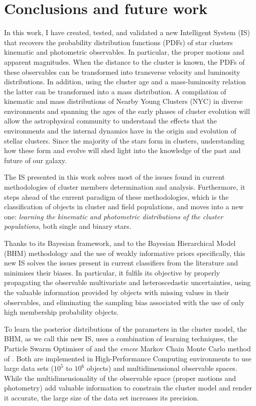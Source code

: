 \chapter{Conclusions and future work}
\label{chap:conclusions}

In this work, I have created, tested, and validated a new Intelligent System (IS) that recovers the probability distribution functions (PDFs) of star clusters kinematic and photometric observables. In particular, the proper motions and apparent magnitudes. When the distance to the cluster is known, the PDFs of these observables can be transformed into transverse velocity and luminosity distributions. In addition, using the cluster age and a mass-luminosity relation the latter can be transformed into a mass distribution. A compilation of kinematic and mass distributions of Nearby Young Clusters (NYC) in diverse environments and spanning the ages of the early phases of cluster evolution will allow the astrophysical community to understand the effects that the environments and the internal dynamics have in the origin and evolution of stellar clusters. Since the majority of the stars form in clusters, understanding how these form and evolve will shed light into the knowledge of the past and future of our galaxy. 

The IS presented in this work solves most of the issues found in current methodologies of cluster members determination and analysis. Furthermore, it steps ahead of the current paradigm of these methodologies, which is the classification of objects in cluster and field populations, and moves into a new one: \textit{learning the kinematic and photometric distributions of the cluster populations}, both single and binary stars.

Thanks to its Bayesian framework, and to the Bayesian Hierarchical Model (BHM) methodology and the use of weakly informative priors specifically, this new IS solves the issues present in current classifiers from the literature and minimises their biases. In particular, it fulfils its objective by properly propagating the observable multivariate and heteroscedastic uncertainties, using the valuable information provided by objects with missing values in their observables, and eliminating the sampling bias associated with the use of only high membership probability objects.

To learn the posterior distributions of the parameters in the cluster model, the BHM, as we call this new IS, uses a combination of learning techniques, the Particle Swarm Optimiser of \citet{Kennedy1995,Clerc2002} and the \emph{emcee} Markov Chain Monte Carlo method of \citet{Foreman2013}. Both are implemented in High-Performance Computing environments to use large data sets ($10^5$ to $10^6$ objects) and multidimensional observable spaces. While the multidimensionality of the observable space (proper motions and photometry) add valuable information to constrain the cluster model and render it accurate, the large size of the data set increases its precision. 

